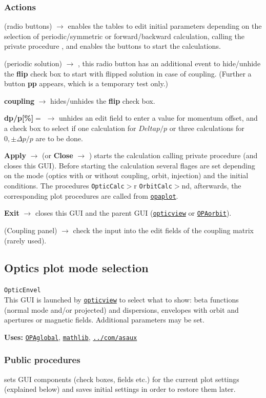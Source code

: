 \documentclass[12pt]{article}
\newcommand\code[1]{{\tt #1}}
\newcommand{\ofld}[1]{\colorbox{black!15}{{\bf #1}}}
\newcommand{\ofldx}[1]{\colorbox{black!15}{(#1)}}
\newcommand\guico[1]{{\color{blue}\code{#1}}}
\newcommand{\unico}[1]{{\color{burntorange}\code{#1}}}
\newcommand{\evcod}[2]{\ofld{#1} $\rightarrow$ \guico{#2}}
\newcommand{\evcodx}[2]{\ofldx{#1} $\rightarrow$ \guico{#2}}
\newcommand{\prcod}[2]{\opauni{#1}$>$\unico{#2}}
\newcommand{\opagui}[1]{\colorbox{blue!20}{\code{#1}}}
\newcommand{\oguih}[2]{\subsection{\label{#2}#1}{\Huge\opagui{#2}}\\}
\newcommand{\ogui}[1]{\hyperref[#1]{\opagui{#1}}}
\newcommand{\opauni}[1]{\colorbox{orange!30}{\code{#1}}}
\newcommand{\ouni}[1]{\hyperref[#1]{\opauni{#1}}}
\newcommand{\uses}[1]{{\bf Uses: } #1}
\newcommand{\desc}[1]{#1}
\newcommand{\act}[1]{\subsubsection*{Actions} #1}
\newcommand{\ppro}[1]{\subsubsection*{Public procedures} #1}
\begin{document}
\act{
\evcodx{radio buttons}{rbutClick} enables the tables to edit initial parameters depending on the selection of periodic/symmetric or forward/backward calculation, calling the private procedure \guico{set\_pan\_ini}, and enables the buttons to start the calculations.

\evcodx{periodic solution}{rbutperChange}, this radio button has an additional event to hide/unhide the \ofld{flip} check box to start with flipped solution in case of coupling. (Further a button \ofld{pp} appears, which is a temporary test only.)

\evcod{coupling}{chk\_coupChange} hides/unhides the \ofld{flip} check box. 

\evcod{dp/p[\%]$=$}{but\_dppClick} unhides an edit field to enter a value for momentum offset, and a check box to select if one calculation for $Delta p/p$  or three calculations for $0,\pm\Delta p/p$ are to be done.

\evcod{Apply}{butapplyClick} (or \evcod{Close}{butcloClick}) starts the calculation calling private procedure \guico{Go} (and closes this GUI). Before starting the calculation several flages are set depending on the mode (optics with or without coupling, orbit, injection) and the initial conditions. The procedures \prcod{OpticCalc} or \prcod{OrbitCalc} and, afterwards, the corresponding plot procedures are called from \ouni{opaplot}.

\evcod{Exit}{butexitClick} closes this GUI and the parent GUI (\ogui{opticview} or \ogui{OPAorbit}).

\evcodx{Coupling panel}{ed\_couKeyPress,ed\_couExit} check the input into the edit fields of the coupling matrix (rarely used).
}


\oguih{Optics plot mode selection}{OpticEnvel} 

\desc{This GUI is launched by \ogui{opticview} to select what to show: beta functions (normal mode and/or projected) and dispersions, envelopes with orbit and apertures or magnetic fields. Additional parameters may be set.
}

\uses{\ouni{OPAglobal}, \ouni{mathlib}, \ouni{../com/asaux}} 

\ppro{
\guico{Load} sets GUI components (check boxes, fields etc.) for the current plot settings (explained below) and saves initial settings in order to restore them later.
}
\end{document}
